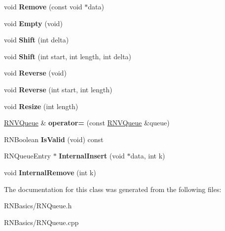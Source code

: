 \begin{DoxyCompactItemize}
\item 
void {\bfseries Remove} (const void $\ast$data)\hypertarget{class_r_n_v_queue_ae228ec00dd54a758fe18006ab011d3c4}{}\label{class_r_n_v_queue_ae228ec00dd54a758fe18006ab011d3c4}

\item 
void {\bfseries Empty} (void)\hypertarget{class_r_n_v_queue_a998b152b3879dc90d9171d7d657e7000}{}\label{class_r_n_v_queue_a998b152b3879dc90d9171d7d657e7000}

\item 
void {\bfseries Shift} (int delta)\hypertarget{class_r_n_v_queue_a6db8d4c419fb1f052221f6ec29157da8}{}\label{class_r_n_v_queue_a6db8d4c419fb1f052221f6ec29157da8}

\item 
void {\bfseries Shift} (int start, int length, int delta)\hypertarget{class_r_n_v_queue_a2066fed5b1a7440b7d7b5dc63a73052d}{}\label{class_r_n_v_queue_a2066fed5b1a7440b7d7b5dc63a73052d}

\item 
void {\bfseries Reverse} (void)\hypertarget{class_r_n_v_queue_ad9cb7b6232946904dea47db2e5c4e582}{}\label{class_r_n_v_queue_ad9cb7b6232946904dea47db2e5c4e582}

\item 
void {\bfseries Reverse} (int start, int length)\hypertarget{class_r_n_v_queue_aad0bacccb87cf4b8fac71b3ffc1fa9fd}{}\label{class_r_n_v_queue_aad0bacccb87cf4b8fac71b3ffc1fa9fd}

\item 
void {\bfseries Resize} (int length)\hypertarget{class_r_n_v_queue_a36dfcd4e3a7d4fb08fb39750a7ff63c4}{}\label{class_r_n_v_queue_a36dfcd4e3a7d4fb08fb39750a7ff63c4}

\item 
\hyperlink{class_r_n_v_queue}{R\+N\+V\+Queue} \& {\bfseries operator=} (const \hyperlink{class_r_n_v_queue}{R\+N\+V\+Queue} \&queue)\hypertarget{class_r_n_v_queue_a782956128407219db2c6124dee37d8ce}{}\label{class_r_n_v_queue_a782956128407219db2c6124dee37d8ce}

\item 
R\+N\+Boolean {\bfseries Is\+Valid} (void) const \hypertarget{class_r_n_v_queue_aa581385880589204dd9e5c6e10d80a32}{}\label{class_r_n_v_queue_aa581385880589204dd9e5c6e10d80a32}

\item 
R\+N\+Queue\+Entry $\ast$ {\bfseries Internal\+Insert} (void $\ast$data, int k)\hypertarget{class_r_n_v_queue_a20247cf107e886bb74be7d565c65882a}{}\label{class_r_n_v_queue_a20247cf107e886bb74be7d565c65882a}

\item 
void {\bfseries Internal\+Remove} (int k)\hypertarget{class_r_n_v_queue_ac6525acb54e9b2326d16cdb3f9585c2d}{}\label{class_r_n_v_queue_ac6525acb54e9b2326d16cdb3f9585c2d}

\end{DoxyCompactItemize}


The documentation for this class was generated from the following files\+:\begin{DoxyCompactItemize}
\item 
R\+N\+Basics/R\+N\+Queue.\+h\item 
R\+N\+Basics/R\+N\+Queue.\+cpp\end{DoxyCompactItemize}
